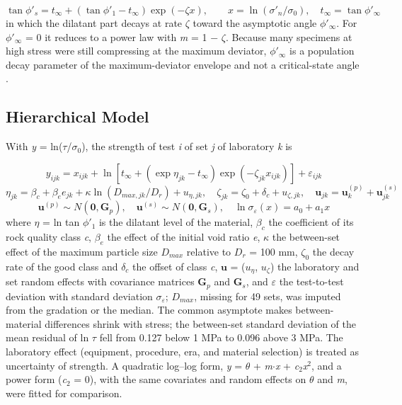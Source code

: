 \documentclass[Journal,letterpaper]{ascelike-new}
\begin{document}
\begin{equation}
\tan\phi'_s=t_\infty+\left(\tan\phi'_1-t_\infty\right)\exp(-\zeta x),\qquad x=\ln(\sigma'_n/\sigma_0),\quad t_\infty=\tan\phi'_\infty
\end{equation}
\noindent in which the dilatant part decays at rate $\zeta$ toward the asymptotic angle $\phi'_\infty$. For $\phi'_\infty$ = 0 it reduces to a power law with \textit{m} = 1 $-$ $\zeta$. Because many specimens at high stress were still compressing at the maximum deviator, $\phi'_\infty$ is a population decay parameter of the maximum-deviator envelope and not a critical-state angle \cite{been1985}.

\subsection{Hierarchical Model}
With \textit{y} = ln($\tau$/$\sigma_0$), the strength of test \textit{i} of set \textit{j} of laboratory \textit{k} is

\begin{equation}
y_{ijk}=x_{ijk}+\ln\!\left[t_\infty+\left(\exp\eta_{jk}-t_\infty\right)\exp\!\left(-\zeta_{jk}x_{ijk}\right)\right]+\varepsilon_{ijk}
\end{equation}
\begin{equation}
\eta_{jk}=\beta_{c}+\beta_e e_{jk}+\kappa\ln\!\left(D_{max,jk}/D_r\right)+u_{\eta,jk},\quad \zeta_{jk}=\zeta_0+\delta_{c}+u_{\zeta,jk},\quad \mathbf{u}_{jk}=\mathbf{u}^{(p)}_k+\mathbf{u}^{(s)}_{jk}
\end{equation}
\begin{equation}
\mathbf{u}^{(p)}\sim N(\mathbf{0},\mathbf{G}_p),\quad \mathbf{u}^{(s)}\sim N(\mathbf{0},\mathbf{G}_s),\quad \ln\sigma_\varepsilon(x)=a_0+a_1x
\end{equation}
\noindent where $\eta$ = ln tan $\phi'_1$ is the dilatant level of the material, $\beta_c$ the coefficient of its rock quality class \textit{c}, $\beta_e$ the effect of the initial void ratio \textit{e}, $\kappa$ the between-set effect of the maximum particle size $D_{max}$ relative to $D_r$ = 100 mm, $\zeta_0$ the decay rate of the good class and $\delta_c$ the offset of class \textit{c}, $\mathbf{u}$ = ($u_\eta$, $u_\zeta$) the laboratory and set random effects with covariance matrices $\mathbf{G}_p$ and $\mathbf{G}_s$, and $\varepsilon$ the test-to-test deviation with standard deviation $\sigma_\varepsilon$; $D_{max}$, missing for 49 sets, was imputed from the gradation or the median. The common asymptote makes between-material differences shrink with stress; the between-set standard deviation of the mean residual of ln $\tau$ fell from 0.127 below 1 MPa to 0.096 above 3 MPa. The laboratory effect (equipment, procedure, era, and material selection) is treated as uncertainty of strength. A quadratic log--log form, \textit{y} = $\theta$ + \textit{m}$\cdot$\textit{x} + \textit{c}$_{2}$\textit{x}$^{2}$, and a power form (\textit{c}$_{2}$ = 0), with the same covariates and random effects on $\theta$ and \textit{m}, were fitted for comparison.
\end{document}
